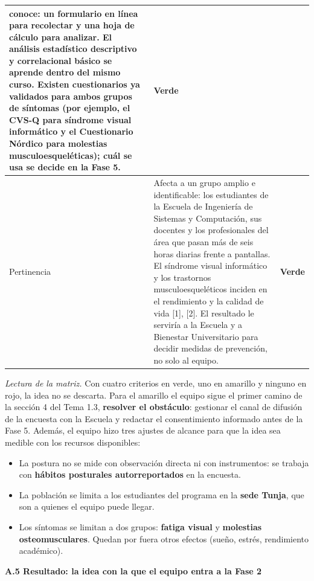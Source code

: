 \begin{center}
\begin{longtable}{L{2.5cm} L{9.3cm} L{2.2cm}}
conoce: un formulario en línea para recolectar y una hoja de cálculo para analizar.
El análisis estadístico descriptivo y correlacional básico se aprende dentro del
mismo curso. Existen cuestionarios ya validados para ambos grupos de síntomas (por
ejemplo, el CVS-Q para síndrome visual informático y el Cuestionario Nórdico para
molestias musculoesqueléticas); cuál se usa se decide en la Fase 5.
& \textcolor{greensignal}{\textbf{Verde}}\\
\midrule
Pertinencia & Afecta a un grupo amplio e identificable: los estudiantes de la
Escuela de Ingeniería de Sistemas y Computación, sus docentes y los profesionales
del área que pasan más de seis horas diarias frente a pantallas. El síndrome visual
informático y los trastornos musculoesqueléticos inciden en el rendimiento y la
calidad de vida [1], [2]. El resultado le serviría a la Escuela y a Bienestar
Universitario para decidir medidas de prevención, no solo al equipo.
& \textcolor{greensignal}{\textbf{Verde}}\\
\bottomrule
\end{longtable}
\end{center}

\noindent\emph{Lectura de la matriz.} Con cuatro criterios en verde, uno en amarillo y
ninguno en rojo, la idea no se descarta. Para el amarillo el equipo sigue el primer
camino de la sección 4 del Tema 1.3, \textbf{resolver el obstáculo}: gestionar el
canal de difusión de la encuesta con la Escuela y redactar el consentimiento
informado antes de la Fase 5. Además, el equipo hizo tres ajustes de alcance para
que la idea sea medible con los recursos disponibles:

\begin{itemize}[leftmargin=1.5em,itemsep=0.3em]
  \item La postura no se mide con observación directa ni con instrumentos: se
  trabaja con \textbf{hábitos posturales autorreportados} en la encuesta.
  \item La población se limita a los estudiantes del programa en la
  \textbf{sede Tunja}, que son a quienes el equipo puede llegar.
  \item Los síntomas se limitan a dos grupos: \textbf{fatiga visual} y
  \textbf{molestias osteomusculares}. Quedan por fuera otros efectos (sueño, estrés,
  rendimiento académico).
\end{itemize}

\bigskip
\noindent\textbf{A.5 Resultado: la idea con la que el equipo entra a la Fase 2}

